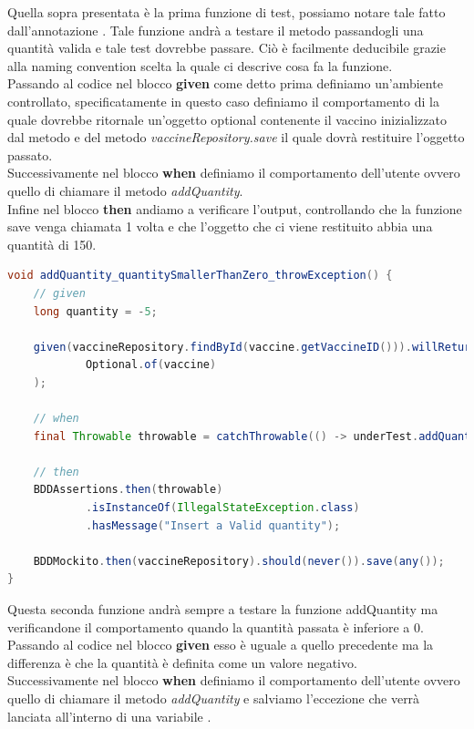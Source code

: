 \documentclass[a4paper,12pt,openany,oneside]{book}
\begin{document}
Quella sopra presentata è la prima funzione di test, possiamo notare tale fatto dall'annotazione .
Tale funzione andrà a testare il metodo  passandogli una quantità valida e tale test dovrebbe passare.
Ciò è facilmente deducibile grazie alla naming convention scelta la quale ci descrive cosa fa la funzione.\\
Passando al codice nel blocco \textbf{given} come detto prima definiamo un'ambiente controllato, specificatamente in questo caso definiamo il comportamento di  la quale dovrebbe ritornale un'oggetto optional contenente il vaccino inizializzato dal metodo  e del metodo \textit{vaccineRepository.save} il quale dovrà restituire l'oggetto passato.\\
Successivamente nel blocco \textbf{when} definiamo il comportamento dell'utente ovvero quello di chiamare il metodo \textit{addQuantity}.\\
Infine nel blocco \textbf{then} andiamo a verificare l'output, controllando che la funzione save venga chiamata 1 volta e che l'oggetto che ci viene restituito abbia una quantità di 150.\\
\noindent
\begin{lstlisting}[language=Java]
void addQuantity_quantitySmallerThanZero_throwException() {
    // given
    long quantity = -5;

    given(vaccineRepository.findById(vaccine.getVaccineID())).willReturn(
            Optional.of(vaccine)
    );

    // when
    final Throwable throwable = catchThrowable(() -> underTest.addQuantity(vaccine.getVaccineID(), quantity));

    // then
    BDDAssertions.then(throwable)
            .isInstanceOf(IllegalStateException.class)
            .hasMessage("Insert a Valid quantity");

    BDDMockito.then(vaccineRepository).should(never()).save(any());
}
\end{lstlisting}
Questa seconda funzione andrà sempre a testare la funzione addQuantity ma verificandone il comportamento quando la quantità passata è inferiore a 0.\\
Passando al codice nel blocco \textbf{given} esso è uguale a quello precedente ma la differenza è che la quantità è definita come un valore negativo.\\
Successivamente nel blocco \textbf{when} definiamo il comportamento dell'utente ovvero quello di chiamare il metodo \textit{addQuantity} e salviamo l'eccezione che verrà lanciata all'interno di una variabile .\\
\end{document}
